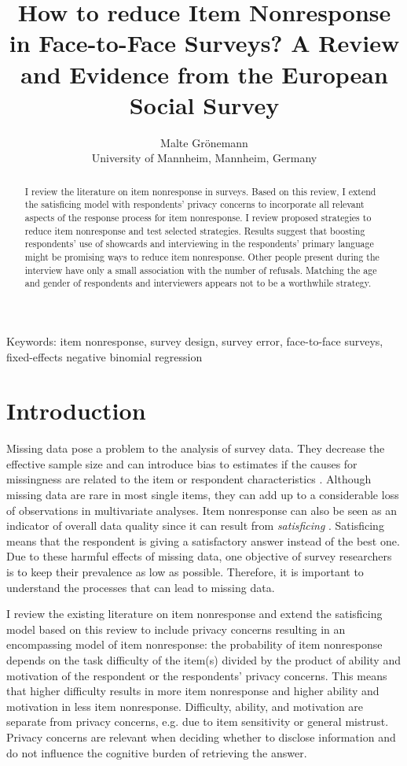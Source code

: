 \documentclass[a4paper,12pt]{article}
\title{How to reduce Item Nonresponse in Face-to-Face Surveys? A Review and Evidence from the European Social Survey}
\author{Malte Grönemann \\ University of Mannheim, Mannheim, Germany}
\begin{document}
\maketitle

\begin{abstract}
I review the literature on item nonresponse in surveys. Based on this review, I extend the satisficing model with respondents' privacy concerns to incorporate all relevant aspects of the response process for item nonresponse. I review proposed strategies to reduce item nonresponse and test selected strategies. Results suggest that boosting respondents' use of showcards and interviewing in the respondents' primary language might be promising ways to reduce item nonresponse. Other people present during the interview have only a small association with the number of refusals. Matching the age and gender of respondents and interviewers appears not to be a worthwhile strategy.
\end{abstract}

Keywords: item nonresponse, survey design, survey error, face-to-face surveys, fixed-effects negative binomial regression

\section{Introduction}

Missing data pose a problem to the analysis of survey data. They decrease the effective sample size and can introduce bias to estimates if the causes for missingness are related to the item or respondent characteristics \citep{deleeuwPreventionTreatmentItem2003}. Although missing data are rare in most single items, they can add up to a considerable loss of observations in multivariate analyses. Item nonresponse can also be seen as an indicator of overall data quality since it can result from \textit{satisficing} \citep{krosnickResponseStrategiesCoping1991}. Satisficing means that the respondent is giving a satisfactory answer instead of the best one. Due to these harmful effects of missing data, one objective of survey researchers is to keep their prevalence as low as possible. Therefore, it is important to understand the processes that can lead to missing data.

I review the existing literature on item nonresponse and extend the satisficing model based on this review to include privacy concerns resulting in an encompassing model of item nonresponse: the probability of item nonresponse depends on the task difficulty of the item(s) divided by the product of ability and motivation of the respondent or the respondents' privacy concerns. This means that higher difficulty results in more item nonresponse and higher ability and motivation in less item nonresponse. Difficulty, ability, and motivation are separate from privacy concerns, e.g. due to item sensitivity or general mistrust. Privacy concerns are relevant when deciding whether to disclose information and do not influence the cognitive burden of retrieving the answer.
\end{document}
